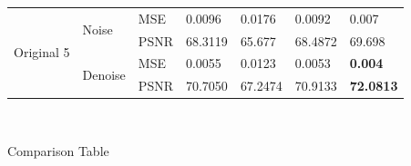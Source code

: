 \begin{center}
\begin{tabular}{llllllllllll|l|l|l|l|l|l|l|l|l|l|l|l|l|}
\multicolumn{4}{|l|}{\multirow{4}{*}{Original 5}} & \multicolumn{4}{l|}{\multirow{2}{*}{Noise}}   & \multicolumn{4}{l|}{MSE}  & \multicolumn{3}{l|}{0.0096}  & \multicolumn{3}{l|}{0.0176}           & \multicolumn{4}{l|}{0.0092}   & \multicolumn{3}{l|}{0.007}            \\ \cline{9-25} 
\multicolumn{4}{|l|}{}                            & \multicolumn{4}{l|}{}                         & \multicolumn{4}{l|}{PSNR} & \multicolumn{3}{l|}{68.3119} & \multicolumn{3}{l|}{65.677}           & \multicolumn{4}{l|}{68.4872}  & \multicolumn{3}{l|}{69.698}           \\ \cline{5-25} 
\multicolumn{4}{|l|}{}                            & \multicolumn{4}{l|}{\multirow{2}{*}{Denoise}} & \multicolumn{4}{l|}{MSE}  & \multicolumn{3}{l|}{0.0055}  & \multicolumn{3}{l|}{0.0123}           & \multicolumn{4}{l|}{0.0053}   & \multicolumn{3}{l|}{\textbf{0.004}}   \\ \cline{9-25} 
\multicolumn{4}{|l|}{}                            & \multicolumn{4}{l|}{}                         & \multicolumn{4}{l|}{PSNR} & \multicolumn{3}{l|}{70.7050} & \multicolumn{3}{l|}{67.2474}          & \multicolumn{4}{l|}{70.9133}  & \multicolumn{3}{l|}{\textbf{72.0813}} \\ \hline
\end{tabular}
	
	\
	
	Comparison Table
\end{center}


\newpage
